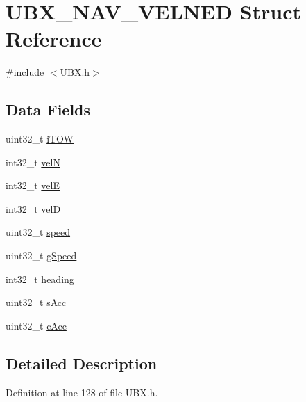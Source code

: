 \hypertarget{struct_u_b_x___n_a_v___v_e_l_n_e_d}{\section{\-U\-B\-X\-\_\-\-N\-A\-V\-\_\-\-V\-E\-L\-N\-E\-D \-Struct \-Reference}
\label{struct_u_b_x___n_a_v___v_e_l_n_e_d}
}


{\ttfamily \#include $<$\-U\-B\-X.\-h$>$}

\subsection*{\-Data \-Fields}
\begin{DoxyCompactItemize}
\item 
uint32\-\_\-t \hyperlink{struct_u_b_x___n_a_v___v_e_l_n_e_d_af2aa06ea75e992d2933728a9eb390734}{i\-T\-O\-W}
\item 
int32\-\_\-t \hyperlink{struct_u_b_x___n_a_v___v_e_l_n_e_d_ab9c0e5be2137b6287caa0d98942c521d}{vel\-N}
\item 
int32\-\_\-t \hyperlink{struct_u_b_x___n_a_v___v_e_l_n_e_d_a6a8d3e61f2818644777283c0ea93dec8}{vel\-E}
\item 
int32\-\_\-t \hyperlink{struct_u_b_x___n_a_v___v_e_l_n_e_d_a3dcace94a7b7317b432bcdeb69271326}{vel\-D}
\item 
uint32\-\_\-t \hyperlink{struct_u_b_x___n_a_v___v_e_l_n_e_d_a16a2a64917c6151546e60e1eb04eb4f6}{speed}
\item 
uint32\-\_\-t \hyperlink{struct_u_b_x___n_a_v___v_e_l_n_e_d_a1c5f6e6ddf0495f4c308b520ae809266}{g\-Speed}
\item 
int32\-\_\-t \hyperlink{struct_u_b_x___n_a_v___v_e_l_n_e_d_a1e0129270ba7fdbba7e441e60cefa8a7}{heading}
\item 
uint32\-\_\-t \hyperlink{struct_u_b_x___n_a_v___v_e_l_n_e_d_a50bfd12e0c7398ab16e312e6a9332e7d}{s\-Acc}
\item 
uint32\-\_\-t \hyperlink{struct_u_b_x___n_a_v___v_e_l_n_e_d_a8740fa2ac06cfb2d09b132c973a99887}{c\-Acc}
\end{DoxyCompactItemize}


\subsection{\-Detailed \-Description}


\-Definition at line 128 of file \-U\-B\-X.\-h.



